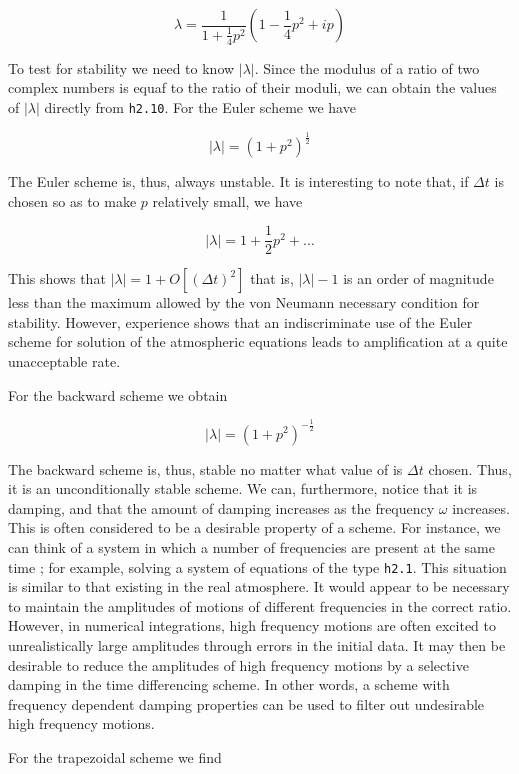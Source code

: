 \[\lambda = \frac{1}{1 + \frac{1}{4}p^{2}}\left( 1 - \frac{1}{4}p^{2} + ip \right)\]

To test for stability we need to know \(| \lambda |\). Since the modulus
of a ratio of two complex numbers is equaf to the ratio of their moduli,
we can obtain the values of \(| \lambda |\) directly from
\texttt{h2.10}. For the Euler scheme we have

\[| \lambda | = \left( 1 + p^{2} \right)^{\frac{1}{2}}\]

The Euler scheme is, thus, always unstable. It is interesting to note
that, if \(\Delta t\) is chosen so as to make \(p\) relatively small, we
have

\[| \lambda | = 1 + \frac{1}{2}p^{2} + \ldots\]

This shows that
\(| \lambda | = 1 + O\left\lbrack \left( \Delta t \right)^{2} \right\rbrack\)
that is, \(| \lambda | - 1\) is an order of magnitude less than the
maximum allowed by the von Neumann necessary condition for stability.
However, experience shows that an indiscriminate use of the Euler scheme
for solution of the atmospheric equations leads to amplification at a
quite unacceptable rate.

For the backward scheme we obtain

\[| \lambda |  = \left( 1 + p^{2} \right)^{-\frac{ 1}{2}}\]

The backward scheme is, thus, stable no matter what value of is
\(\Delta t\) chosen. Thus, it is an unconditionally stable scheme. We
can, furthermore, notice that it is damping, and that the amount of
damping increases as the frequency \(\omega\) increases. This is often
considered to be a desirable property of a scheme. For instance, we can
think of a system in which a number of frequencies are present at the
same time ; for example, solving a system of equations of the type
\texttt{h2.1}. This situation is similar to that existing in the real
atmosphere. It would appear to be necessary to maintain the amplitudes
of motions of different frequencies in the correct ratio. However, in
numerical integrations, high frequency motions are often excited to
unrealistically large amplitudes through errors in the initial data. It
may then be desirable to reduce the amplitudes of high frequency motions
by a selective damping in the time differencing scheme. In other words,
a scheme with frequency dependent damping properties can be used to
filter out undesirable high frequency motions.

For the trapezoidal scheme we find

